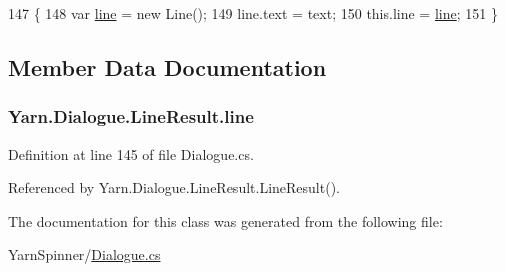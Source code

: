 \begin{DoxyCode}
147                                             \{
148                 var \hyperlink{a00132_abfbb0ea840b02acd0ecdc72c5b120257}{line} = \textcolor{keyword}{new} Line();
149                 line.text = text;
150                 this.line = \hyperlink{a00132_abfbb0ea840b02acd0ecdc72c5b120257}{line};
151             \}
\end{DoxyCode}


\subsection{Member Data Documentation}
\hypertarget{a00132_abfbb0ea840b02acd0ecdc72c5b120257}{
\subsubsection[{line}]{ Yarn.\-Dialogue.\-Line\-Result.\-line}}\label{a00132_abfbb0ea840b02acd0ecdc72c5b120257}


Definition at line 145 of file Dialogue.\-cs.



Referenced by Yarn.\-Dialogue.\-Line\-Result.\-Line\-Result().



The documentation for this class was generated from the following file\-:\begin{DoxyCompactItemize}
\item 
Yarn\-Spinner/\hyperlink{a00305}{Dialogue.\-cs}\end{DoxyCompactItemize}
